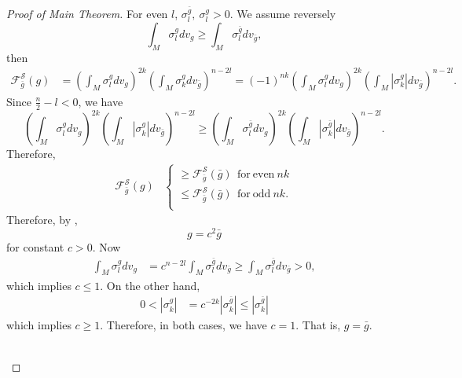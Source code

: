 \documentclass[12pt]{amsart}
\newcommand{\bg}{\bar{g}}
\numberwithin{equation}{section}
\begin{document}
\begin{proof}[Proof of Main Theorem]
    For even $l$, $\sigma_l^{\bg},\ \sigma_l^g>0$. We assume reversely
    \begin{equation*}
        \int_M\sigma_l^gdv_g\geq\int_M\sigma_l^{\bg}dv_{\bg},
    \end{equation*}
    then     
    \begin{align*}
        \mathcal{F}_{\bg}^{\mathcal{S}}(g)&=\left(\int_M\sigma_l^gdv_g\right)^{2k}\left(\int_M\sigma_k^gdv_{\bg}\right)^{n-2l}
        =(-1)^{nk}\left(\int_M\sigma_l^gdv_g\right)^{2k}\left(\int_M|\sigma_k^g|dv_{\bg}\right)^{n-2l}.
    \end{align*}
    Since $\frac{n}{2}-l<0$, we have 
    \begin{equation*}
        \left(\int_M\sigma_l^gdv_g\right)^{2k}\left(\int_M|\sigma_k^g|dv_{\bg}\right)^{n-2l}\geq\left(\int_M\sigma_l^{\bg}dv_g\right)^{2k}\left(\int_M|\sigma_k^{\bg}|dv_{\bg}\right)^{n-2l}.
    \end{equation*}
    Therefore,
    \begin{align*}
    \mathcal{F}_{\bg}^{\mathcal{S}}(g)
        &\begin{cases}
            \geq\mathcal{F}_{\bg}^{\mathcal{S}}(\bg)\ \  \mathrm{for\ even}\ nk \\
            \leq\mathcal{F}_{\bg}^{\mathcal{S}}(\bg)\ \  \mathrm{for\ odd}\ nk. \\
        \end{cases}
    \end{align*}
    Therefore, by ,
    \begin{equation*}
        g=c^2\bg
    \end{equation*}
    for constant $c>0$. Now
    \begin{align*}
        \int_M\sigma_l^gdv_g &= c^{n-2l}\int_M\sigma_l^{\bg}dv_{\bg} \geq \int_M\sigma_l^{\bg}dv_{\bg}>0,
    \end{align*}
    which implies $c\leq1$. On the other hand,
    \begin{align*}
        0<|\sigma_k^g| &= c^{-2k}|\sigma_k^{\bg}|\leq|\sigma_k^{\bg}|
    \end{align*}
    which implies $c\geq1$. Therefore, in both cases, we have $c=1$. That is, $g=\bg$.

    \ \\


\end{proof}
\end{document}

